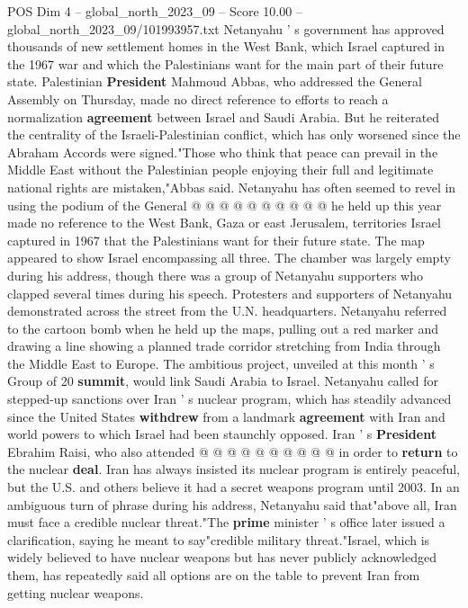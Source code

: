 \begin{textsample}{POS Dim 4 – global\_north\_2023\_09 – Score 10.00 – global\_north\_2023\_09/101993957.txt}
Netanyahu ' s government has approved thousands of new settlement homes in the West Bank, which Israel captured in the 1967 war and which the Palestinians want for the main part of their future state.
Palestinian \textbf{President} Mahmoud Abbas, who addressed the General Assembly on Thursday, made no direct reference to efforts to reach a normalization \textbf{agreement} between Israel and Saudi Arabia.
But he reiterated the centrality of the Israeli-Palestinian conflict, which has only worsened since the Abraham Accords were signed."Those who think that peace can prevail in the Middle East without the Palestinian people enjoying their full and legitimate national rights are mistaken,"Abbas said.
Netanyahu has often seemed to revel in using the podium of the General @ @ @ @ @ @ @ @ @ @ he held up this year made no reference to the West Bank, Gaza or east Jerusalem, territories Israel captured in 1967 that the Palestinians want for their future state.
The map appeared to show Israel encompassing all three.
The chamber was largely empty during his address, though there was a group of Netanyahu supporters who clapped several times during his speech.
Protesters and supporters of Netanyahu demonstrated across the street from the U.N. headquarters.
Netanyahu referred to the cartoon bomb when he held up the maps, pulling out a red marker and drawing a line showing a planned trade corridor stretching from India through the Middle East to Europe.
The ambitious project, unveiled at this month ' s Group of 20 \textbf{summit}, would link Saudi Arabia to Israel.
Netanyahu called for stepped-up sanctions over Iran ' s nuclear program, which has steadily advanced since the United States \textbf{withdrew} from a landmark \textbf{agreement} with Iran and world powers to which Israel had been staunchly opposed.
Iran ' s \textbf{President} Ebrahim Raisi, who also attended @ @ @ @ @ @ @ @ @ @ in order to \textbf{return} to the nuclear \textbf{deal}.
Iran has always insisted its nuclear program is entirely peaceful, but the U.S. and others believe it had a secret weapons program until 2003.
In an ambiguous turn of phrase during his address, Netanyahu said that"above all, Iran must face a credible nuclear threat."The \textbf{prime} minister ' s office later issued a clarification, saying he meant to say"credible military threat."Israel, which is widely believed to have nuclear weapons but has never publicly acknowledged them, has repeatedly said all options are on the table to prevent Iran from getting nuclear weapons.

\end{textsample}

